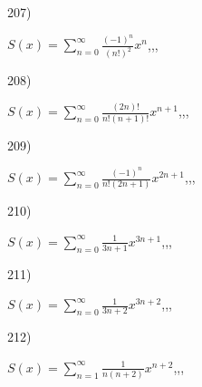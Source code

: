 \documentclass[11pt, ukrainian]{article}
\begin{document}
\par
\vspace{0.9cm}
207) \space 
{%
{$S(x)=\sum\limits_{n=0}^{\infty}{\frac{(-1)^n}{(n!)^2}}{x^{{n}}}$},,, \par \smallskip  
}
\par
\vspace{0.9cm}
208) \space 
{%
{$S(x)=\sum\limits_{n=0}^{\infty}{\frac{(2n)!}{n!(n+1)!}}{x^{{n+1}}}$},,, \par \smallskip  
}
\par
\vspace{0.9cm}
209) \space 
{%
{$S(x)=\sum\limits_{n=0}^{\infty}{\frac{(-1)^n}{n!(2n+1)}}{x^{{2n+1}}}$},,, \par \smallskip  
}
\par
\vspace{0.9cm}
210) \space 
{%
{$S(x)=\sum\limits_{n=0}^{\infty}{\frac{1}{3n+1}}{x^{{3n+1}}}$},,, \par \smallskip  
}
\par
\newpage
211) \space 
{%
{$S(x)=\sum\limits_{n=0}^{\infty}{\frac{1}{3n+2}}{x^{{3n+2}}}$},,, \par \smallskip  
}
\par
\vspace{0.9cm}
212) \space 
{%
{$S(x)=\sum\limits_{n=1}^{\infty}{\frac{1}{n(n+2)}}{x^{{n+2}}}$},,, \par \smallskip  
}
\end{document}

